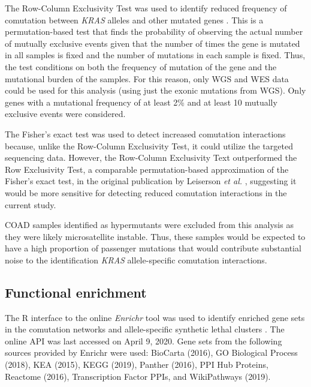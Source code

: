 \documentclass[english, 10pt, letterpaper]{article}
\newcommand{\KRAS}{\emph{KRAS}}
\begin{document}
The Row-Column Exclusivity Test was used to identify reduced frequency of comutation between \KRAS{} alleles and other mutated genes \cite{Leiserson2016}.
This is a permutation-based test that finds the probability of observing the actual number of mutually exclusive events given that the number of times the gene is mutated in all samples is fixed and the number of mutations in each sample is fixed.
Thus, the test conditions on both the frequency of mutation of the gene and the mutational burden of the samples.
For this reason, only WGS and WES data could be used for this analysis (using just the exonic mutations from WGS).
Only genes with a mutational frequency of at least 2\% and at least 10 mutually exclusive events were considered.

The Fisher's exact test was used to detect increased comutation interactions because, unlike the Row-Column Exclusivity Test, it could utilize the targeted sequencing data.
However, the Row-Column Exclusivity Text outperformed the Row Exclusivity Test, a comparable permutation-based approximation of the Fisher's exact test, in the original publication by Leiserson \emph{et al.} \cite{Leiserson2016}, suggesting it would be more sensitive for detecting reduced comutation interactions in the current study.

COAD samples identified as hypermutants were excluded from this analysis as they were likely microsatellite instable.
Thus, these samples would be expected to have a high proportion of passenger mutations that would contribute substantial noise to the identification \KRAS{} allele-specific comutation interactions.


\subsection*{Functional enrichment}
The R interface to the online \emph{Enrichr} tool was used to identify enriched gene sets in the comutation networks and allele-specific synthetic lethal clusters \cite{Chen2013, Kuleshov2016Enrichr:Update., R-enrichR}.
The online API was last accessed on April 9, 2020.
Gene sets from the following sources provided by Enrichr were used: BioCarta (2016), GO Biological Process (2018), KEA (2015), KEGG (2019), Panther (2016), PPI Hub Proteins, Reactome (2016), Transcription Factor PPIs, and WikiPathways (2019).
\end{document}
